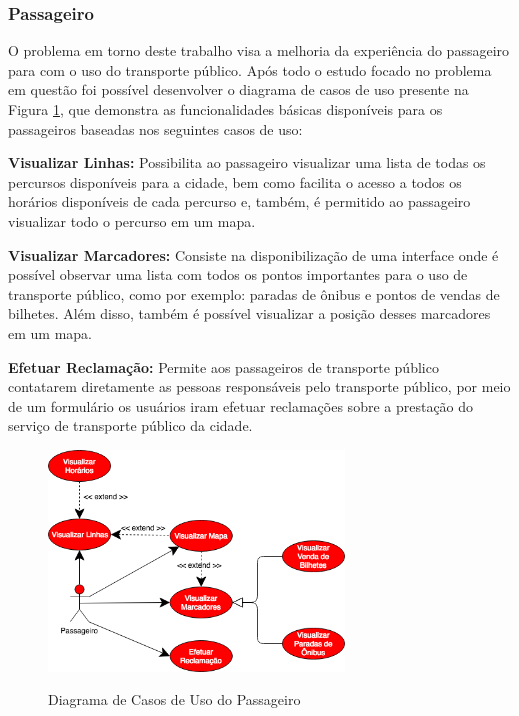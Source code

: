 {{{{\subsubsection*{Passageiro}

O problema em torno deste trabalho visa a melhoria da experiência do passageiro para com o uso do transporte público. Após todo o estudo focado no problema em questão foi possível desenvolver o diagrama de casos de uso presente na Figura \ref{fig:caso-de-uso-passageiro}, que demonstra as funcionalidades básicas disponíveis para os passageiros baseadas nos seguintes casos de uso:

\begin{lista}
\item \textbf{Visualizar Linhas:} Possibilita ao passageiro visualizar uma lista de todas os percursos disponíveis para a cidade, bem como facilita o acesso a todos os horários disponíveis de cada percurso e, também, é permitido ao passageiro visualizar todo o percurso em um mapa.
\item \textbf{Visualizar Marcadores:} Consiste na disponibilização de uma interface onde é possível observar uma lista com todos os pontos importantes para o uso de transporte público, como por exemplo: paradas de ônibus e pontos de vendas de bilhetes. Além disso, também é possível visualizar a posição desses marcadores em um mapa.
\item \textbf{Efetuar Reclamação:} Permite aos passageiros de transporte público contatarem diretamente as pessoas responsáveis pelo transporte público, por meio de um formulário os usuários iram efetuar reclamações sobre a prestação do serviço de transporte público da cidade.
\end{lista}

\begin{figure}[H]
\caption{Diagrama de Casos de Uso do Passageiro}
\centering
\includegraphics[width=0.7\textwidth]{imagens/caso-de-uso-passageiro.png}
\label{fig:caso-de-uso-passageiro}
\end{figure}

}}}}

